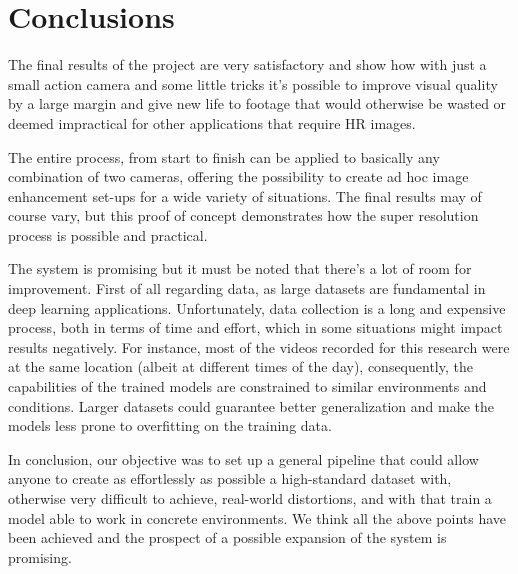 \newpage
\chapter{Conclusions}
\label{cha:conclusions}

The final results of the project are very satisfactory and show how with just a small action camera and some little tricks it's possible to improve visual quality by a large margin and give new life to footage that would otherwise be wasted or deemed impractical for other applications that require HR images.

The entire process, from start to finish can be applied to basically any combination of two cameras, offering the possibility to create ad hoc image enhancement set-ups for a wide variety of situations. The final results may of course vary, but this proof of concept demonstrates how the super resolution process is possible and practical.

The system is promising but it must be noted that there's a lot of room for improvement. First of all regarding data, as large datasets are fundamental in deep learning applications.  Unfortunately, data collection is a long and expensive process, both in terms of time and effort, which in some situations might impact results negatively. For instance, most of the videos recorded for this research were at the same location (albeit at different times of the day), consequently, the capabilities of the trained models are constrained to similar environments and conditions. Larger datasets could guarantee better generalization and make the models less prone to overfitting on the training data.

In conclusion, our objective was to set up a general pipeline that could allow anyone to create as effortlessly as possible a high-standard dataset with, otherwise very difficult to achieve, real-world distortions, and with that train a model able to work in concrete environments. We think all the above points have been achieved and the prospect of a possible expansion of the system is promising.
